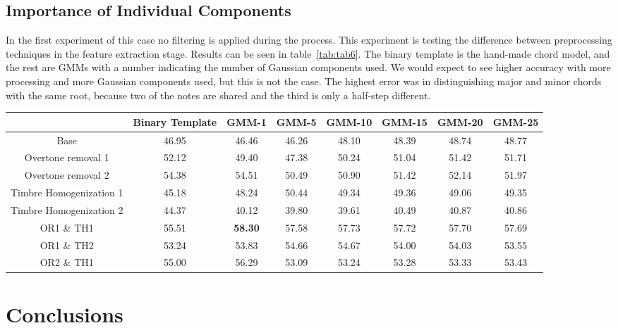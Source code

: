 \documentclass{sig-alternate}
\begin{document}
\subsection{Importance of Individual Components}

In the first experiment of this case no filtering is applied during the process. This experiment is testing the difference between preprocessing techniques in the feature extraction stage. Results can be seen in table~\ref{tab:tab6}. The binary template is the hand-made chord model, and the rest are GMMs with a number indicating the number of Gaussian components used. We would expect to see higher accuracy with more processing and more Gaussian components used, but this is not the case. The highest error was in distinguishing major and minor chords with the same root, because two of the notes are shared and the third is only a half-step different.

\begin{table*}
\centering
\begin{tabular}{|c|c|c|c|c|c|c|c|} \hline
 & Binary Template & GMM-1 & GMM-5 & GMM-10 & GMM-15 & GMM-20 & GMM-25 \\ \hline
Base & 46.95 & 46.46 & 46.26 & 48.10 & 48.39 & 48.74 & 48.77 \\ \hline
Overtone removal 1 & 52.12 & 49.40 & 47.38 & 50.24 & 51.04 & 51.42 & 51.71 \\ \hline
Overtone removal 2 & 54.38 & 54.51 & 50.49 & 50.90 & 51.42 & 52.14 & 51.97 \\ \hline
Timbre Homogenization 1 & 45.18 & 48.24 & 50.44 & 49.34 & 49.36 & 49.06 & 49.35 \\ \hline
Timbre Homogenization 2 & 44.37 & 40.12 & 39.80 & 39.61 & 40.49 & 40.87 & 40.86 \\ \hline
OR1 \& TH1 & 55.51 & \textbf{58.30} & 57.58 & 57.73 & 57.72 & 57.70 & 57.69 \\ \hline
OR1 \& TH2 & 53.24 & 53.83 & 54.66 & 54.67 & 54.00 & 54.03 & 53.55 \\ \hline
OR2 \& TH1 & 55.00 & 56.29 & 53.09 & 53.24 & 53.28 & 53.33 & 53.43 \\ \hline
\end{tabular}
\caption{Average accuracy without filtering (research case 3, experiment 1).}
\label{tab:tab6}
\end{table*}


\section{Conclusions}
\end{document}
